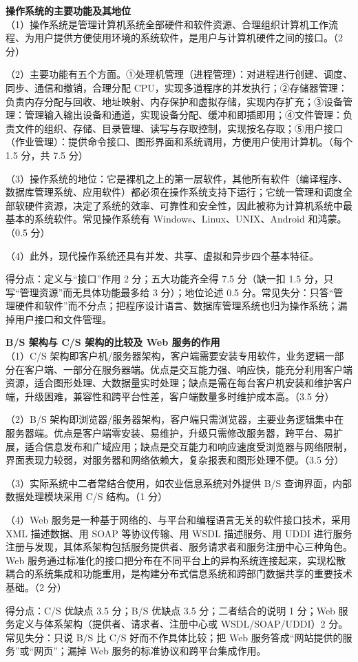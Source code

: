 \documentclass[a4paper,11pt]{article}
\begin{document}
\newpage
{}

\q \textbf{操作系统的主要功能及其地位}\\
（1）操作系统是管理计算机系统全部硬件和软件资源、合理组织计算机工作流程、为用户提供方便使用环境的系统软件，是用户与计算机硬件之间的接口。（2 分）

（2）主要功能有五个方面。①处理机管理（进程管理）：对进程进行创建、调度、同步、通信和撤销，合理分配 CPU，实现多道程序的并发执行；②存储器管理：负责内存分配与回收、地址映射、内存保护和虚拟存储，实现内存扩充；③设备管理：管理输入输出设备和通道，实现设备分配、缓冲和即插即用；④文件管理：负责文件的组织、存储、目录管理、读写与存取控制，实现按名存取；⑤用户接口（作业管理）：提供命令接口、图形界面和系统调用，方便用户使用计算机。（每个 1.5 分，共 7.5 分）

（3）操作系统的地位：它是裸机之上的第一层软件，其他所有软件（编译程序、数据库管理系统、应用软件）都必须在操作系统支持下运行；它统一管理和调度全部软硬件资源，决定了系统的效率、可靠性和安全性，因此被称为计算机系统中最基本的系统软件。常见操作系统有 Windows、Linux、UNIX、Android 和鸿蒙。（0.5 分）

（4）此外，现代操作系统还具有并发、共享、虚拟和异步四个基本特征。
\begin{analysis}得分点：定义与“接口”作用 2 分；五大功能齐全得 7.5 分（缺一扣 1.5 分，只写“管理资源”而无具体功能最多给 3 分）；地位论述 0.5 分。常见失分：只答“管理硬件和软件”而不分点；把程序设计语言、数据库管理系统也归为操作系统；漏掉用户接口和文件管理。\end{analysis}

\q \textbf{B/S 架构与 C/S 架构的比较及 Web 服务的作用}\\
（1）C/S 架构即客户机/服务器架构，客户端需要安装专用软件，业务逻辑一部分在客户端、一部分在服务器端。优点是交互能力强、响应快，能充分利用客户端资源，适合图形处理、大数据量实时处理；缺点是需在每台客户机安装和维护客户端，升级困难，兼容性和跨平台性差，客户端数量多时维护成本高。（3.5 分）

（2）B/S 架构即浏览器/服务器架构，客户端只需浏览器，主要业务逻辑集中在服务器端。优点是客户端零安装、易维护，升级只需修改服务器，跨平台、易扩展，适合信息发布和广域应用；缺点是交互能力和响应速度受浏览器与网络限制，界面表现力较弱，对服务器和网络依赖大，复杂报表和图形处理不便。（3.5 分）

（3）实际系统中二者常结合使用，如农业信息系统对外提供 B/S 查询界面，内部数据处理模块采用 C/S 结构。（1 分）

（4）Web 服务是一种基于网络的、与平台和编程语言无关的软件接口技术，采用 XML 描述数据、用 SOAP 等协议传输、用 WSDL 描述服务、用 UDDI 进行服务注册与发现，其体系架构包括服务提供者、服务请求者和服务注册中心三种角色。Web 服务通过标准化的接口把分布在不同平台上的异构系统连接起来，实现松散耦合的系统集成和功能重用，是构建分布式信息系统和跨部门数据共享的重要技术基础。（2 分）
\begin{analysis}得分点：C/S 优缺点 3.5 分；B/S 优缺点 3.5 分；二者结合的说明 1 分；Web 服务定义与体系架构（提供者、请求者、注册中心或 WSDL/SOAP/UDDI）2 分。常见失分：只说 B/S 比 C/S 好而不作具体比较；把 Web 服务答成“网站提供的服务”或“网页”；漏掉 Web 服务的标准协议和跨平台集成作用。\end{analysis}
\end{document}
